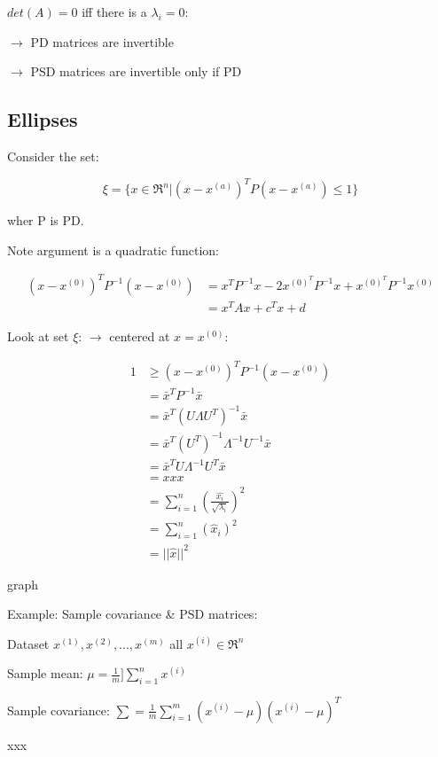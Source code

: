 $det(A) = 0$ iff there is a $\lambda_i = 0$:

$\rightarrow$ PD matrices are invertible

$\rightarrow$ PSD matrices are invertible only if PD




\subsection{Ellipses} 

Consider the set:

\begin{equation*}
\xi = \{x\in \Re^n | (x - x^{(a)})^T P(x - x^{(a)}) \leq 1 \}
\end{equation*}

wher P is PD.

Note argument is a quadratic function:

\begin{align*}
(x - x^{(0)})^TP^{-1}(x - x^{(0)}) &= x^TP^{-1}x - 2x^{(0)^T}P^{-1}x + x^{(0)^T}P^{-1}x^{(0)}\\
&= x^TAx + c^Tx + d
\end{align*}

Look at set $\xi$: $\rightarrow$ centered at $x = x^{(0)}$:

\begin{align*}
1 &\geq (x - x^{(0)})^TP^{-1}(x - x^{(0)})\\
&= \bar{x}^TP^{-1}\bar{x}\\
&= \bar{x}^T(U\Lambda U^T)^{-1}\bar{x}\\
&= \bar{x}^T(U^T)^{-1}\Lambda^{-1}U^{-1}\bar{x}\\
&= \bar{x}^TU\Lambda^{-1}U^T\bar{x}\\
&= xxx\\
&= \sum^n_{i=1}(\frac{\hat{x_i}}{\sqrt{\lambda_i}})^2\\
&= \sum^n_{i=1}(\hat{x}_i)^2\\
&= ||\hat{x}||^2
\end{align*}

graph


Example: Sample covariance \& PSD matrices:

Dataset $x^{(1)}, x^{(2)}, ..., x^{(m)}$ all $x^{(i)}\in \Re^n$

Sample mean: $\mu = \frac{1}{m}]\sum^n_{i=1}x^{(i)}$

Sample covariance: $\sum = \frac{1}{m}\sum^m_{i=1}(x^{(i)}-\mu)(x^{(i)}-\mu)^T$

xxx

